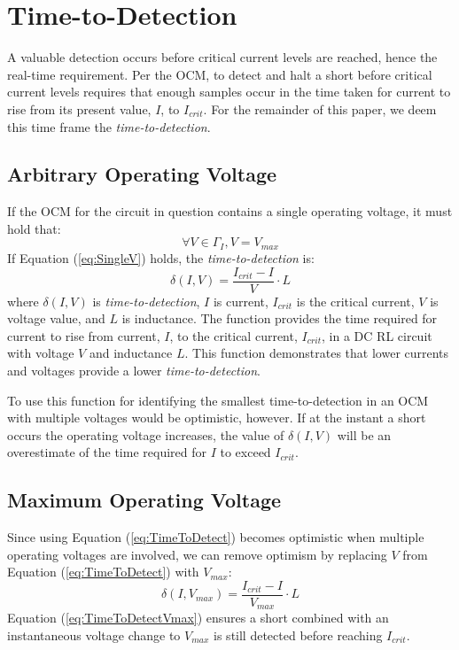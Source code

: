 \documentclass[11pt,compsoc,oneside]{report}
\begin{document}
\section{Time-to-Detection}
A valuable detection occurs before critical current levels are reached, hence the real-time requirement. Per the OCM, to detect and halt a short before critical current levels requires that enough samples occur in the time taken for current to rise from its present value, $I$, to $I_{crit}$. For the remainder of this paper, we deem this time frame the \textit{time-to-detection}.

\subsection{Arbitrary Operating Voltage}
If the OCM for the circuit in question contains a single operating voltage, it must hold that:
\begin{equation}\label{eq:SingleV}
\forall  V  \in \Gamma_{I}, V = V_{max}
\end{equation}
If Equation (\ref{eq:SingleV}) holds, the \textit{time-to-detection}  is:
\begin{equation}\label{eq:TimeToDetect}
\delta(I,V) = \frac{I_{crit}-I}{V}\cdot L
\end{equation}
where $\delta(I,V)$ is \textit{time-to-detection}, $I$ is current, $I_{crit}$ is the critical current, $V$ is voltage value, and $L$ is inductance. The function provides the time required for current to rise from current, $I$, to the critical current, $I_{crit}$, in a DC RL circuit with voltage $V$ and inductance $L$. This function demonstrates that lower currents and voltages provide a lower \textit{time-to-detection}.
 
To use this function for identifying the smallest time-to-detection in an OCM with multiple voltages would be optimistic, however. If at the instant a short occurs the operating voltage increases, the value of $\delta(I,V)$ will be an overestimate of the time required for $I$ to exceed $I_{crit}$.

\subsection{Maximum Operating Voltage}
Since using Equation (\ref{eq:TimeToDetect}) becomes optimistic when multiple operating voltages are involved, we can remove optimism by replacing $V$ from Equation (\ref{eq:TimeToDetect}) with $V_{max}$:
\begin{equation}\label{eq:TimeToDetectVmax}
\delta(I,V_{max}) = \frac{I_{crit}-I}{V_{max}}\cdot L
\end{equation}
Equation (\ref{eq:TimeToDetectVmax}) ensures a short combined with an instantaneous voltage change to $V_{max}$ is still detected before reaching $I_{crit}$.
\end{document}
